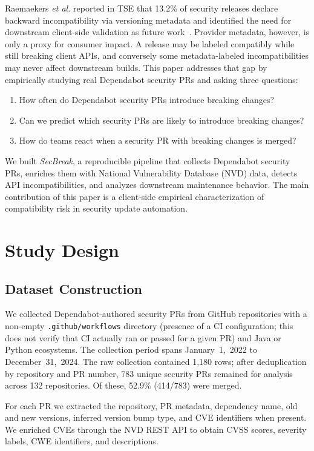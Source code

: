 \documentclass[10pt,journal]{IEEEtran}
\begin{document}
Raemaekers \textit{et al.} reported in TSE that 13.2\% of security releases declare backward incompatibility via versioning metadata and identified the need for downstream client-side validation as future work~\cite{raemaekers2021}. Provider metadata, however, is only a proxy for consumer impact. A release may be labeled compatibly while still breaking client APIs, and conversely some metadata-labeled incompatibilities may never affect downstream builds. This paper addresses that gap by empirically studying real Dependabot security PRs and asking three questions:

\begin{enumerate}
\item How often do Dependabot security PRs introduce breaking changes?
\item Can we predict which security PRs are likely to introduce breaking changes?
\item How do teams react when a security PR with breaking changes is merged?
\end{enumerate}

We built \textit{SecBreak}, a reproducible pipeline that collects Dependabot security PRs, enriches them with National Vulnerability Database (NVD) data, detects API incompatibilities, and analyzes downstream maintenance behavior. The main contribution of this paper is a client-side empirical characterization of compatibility risk in security update automation.

\section{Study Design}
\subsection{Dataset Construction}
We collected Dependabot-authored security PRs from GitHub repositories with a non-empty \texttt{.github/workflows} directory (presence of a CI configuration; this does not verify that CI actually ran or passed for a given PR) and Java or Python ecosystems. The collection period spans January~1,~2022 to December~31,~2024. The raw collection contained 1{,}180 rows; after deduplication by repository and PR number, 783 unique security PRs remained for analysis across 132 repositories. Of these, 52.9\% (414/783) were merged.

For each PR we extracted the repository, PR metadata, dependency name, old and new versions, inferred version bump type, and CVE identifiers when present. We enriched CVEs through the NVD REST API to obtain CVSS scores, severity labels, CWE identifiers, and descriptions.
\end{document}
